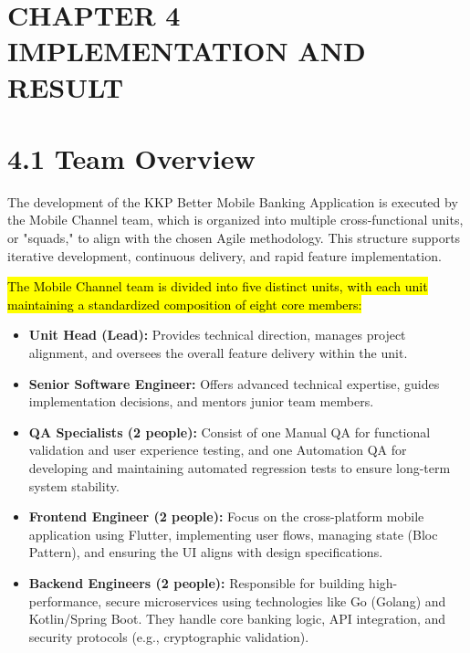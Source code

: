 \section{}\label{section-44}

\section{\texorpdfstring{\hfill\break
}{ }}\label{section-45}

\section{\texorpdfstring{\textbf{CHAPTER 4\\
IMPLEMENTATION AND
RESULT}}{CHAPTER 4 IMPLEMENTATION AND RESULT}}\label{chapter-4-implementation-and-result}

\section{\texorpdfstring{\textbf{4.1 Team
Overview}}{4.1 Team Overview}}\label{team-overview}

The development of the KKP Better Mobile Banking Application is executed
by the Mobile Channel team, which is organized into multiple
cross-functional units, or "squads," to align with the chosen Agile
methodology. This structure supports iterative development, continuous
delivery, and rapid feature implementation.

\hl{\hfill\break
The Mobile Channel team is divided into five distinct units, with each
unit maintaining a standardized composition of eight core members:}

\begin{itemize}
\item
  \textbf{Unit Head (Lead):} Provides technical direction, manages
  project alignment, and oversees the overall feature delivery within
  the unit.
\item
  \textbf{Senior Software Engineer:} Offers advanced technical
  expertise, guides implementation decisions, and mentors junior team
  members.
\item
  \textbf{QA Specialists (2 people):} Consist of one Manual QA for
  functional validation and user experience testing, and one Automation
  QA for developing and maintaining automated regression tests to ensure
  long-term system stability.
\item
  \textbf{Frontend Engineer (2 people):} Focus on the cross-platform
  mobile application using Flutter, implementing user flows, managing
  state (Bloc Pattern), and ensuring the UI aligns with design
  specifications.
\item
  \textbf{Backend Engineers (2 people):} Responsible for building
  high-performance, secure microservices using technologies like Go
  (Golang) and Kotlin/Spring Boot. They handle core banking logic, API
  integration, and security protocols (e.g., cryptographic validation).
\end{itemize}

